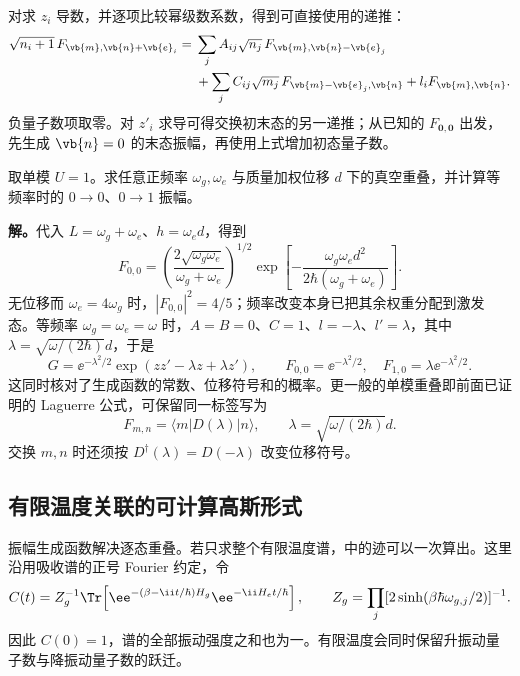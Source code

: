 对求 $z_i$ 导数，并逐项比较幂级数系数，得到可直接使用的递推：
\begin{equation}
\begin{aligned}
 \sqrt{n_i+1}\,F_{\vb{m},\vb{n}+\vb{e}_i}
 ={}&\sum_j A_{ij}\sqrt{n_j}\,F_{\vb{m},\vb{n}-\vb{e}_j}\\
 &+\sum_j C_{ij}\sqrt{m_j}\,F_{\vb{m}-\vb{e}_j,\vb{n}}
 +l_iF_{\vb{m},\vb{n}}.
\end{aligned}
\label{eq:doktorov-fc-recurrence}
\end{equation}
负量子数项取零。对 $z'_i$ 求导可得交换初末态的另一递推；从已知的 $F_{\mathbf0,\mathbf0}$ 出发，先生成 $\vb{n}=0$ 的末态振幅，再使用上式增加初态量子数。

\begin{workedexample}[位移与频率改变怎样共同改变真空重叠]
取单模 $U=1$。求任意正频率 $\omega_g,\omega_e$ 与质量加权位移 $d$ 下的真空重叠，并计算等频率时的 $0\to0$、$0\to1$ 振幅。

\textbf{解。}代入 $L=\omega_g+\omega_e$、$h=\omega_ed$，得到
\[
 F_{0,0}
 =\left(\frac{2\sqrt{\omega_g\omega_e}}{\omega_g+\omega_e}\right)^{1/2}
 \exp\!\left[-\frac{\omega_g\omega_ed^2}
 {2\hbar(\omega_g+\omega_e)}\right].
\]
无位移而 $\omega_e=4\omega_g$ 时，$|F_{0,0}|^2=4/5$；频率改变本身已把其余权重分配到激发态。等频率 $\omega_g=\omega_e=\omega$ 时，$A=B=0$、$C=1$、$l=-\lambda$、$l'=\lambda$，其中 $\lambda=\sqrt{\omega/(2\hbar)}d$，于是
\[
 G=\ee^{-\lambda^2/2}\exp(zz'-\lambda z+\lambda z'),
 \qquad F_{0,0}=\ee^{-\lambda^2/2},\quad
 F_{1,0}=\lambda\ee^{-\lambda^2/2}.
\]
这同时核对了生成函数的常数、位移符号和的概率。更一般的单模重叠即前面已证明的 Laguerre 公式，可保留同一标签写为
\begin{equation}
 F_{m,n}=\langle m|D(\lambda)|n\rangle,
 \qquad \lambda=\sqrt{\omega/(2\hbar)}d.
 \label{eq:huang-rhys-laguerre-overlap}
\end{equation}
交换 $m,n$ 时还须按 $D^\dagger(\lambda)=D(-\lambda)$ 改变位移符号。
\end{workedexample}

\subsection{有限温度关联的可计算高斯形式}

振幅生成函数解决逐态重叠。若只求整个有限温度谱，中的迹可以一次算出。这里沿用吸收谱的正号 Fourier 约定，令
\begin{equation}
 C(t)=Z_g^{-1}\Tr\!\left[\ee^{-(\beta-\ii t/\hbar)H_g}
                              \ee^{-\ii H_et/\hbar}\right],
 \qquad Z_g=\prod_j[2\sinh(\beta\hbar\omega_{g,j}/2)]^{-1}.
 \label{eq:thermal-correlation}
\end{equation}
因此 $C(0)=1$，谱的全部振动强度之和也为一。有限温度会同时保留升振动量子数与降振动量子数的跃迁。

